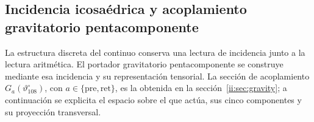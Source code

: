 \subsection{Incidencia icosaédrica y acoplamiento gravitatorio pentacomponente}
\label{ii:sec:ii-pentadica}

La estructura discreta del continuo conserva una lectura de incidencia
junto a la lectura aritmética. El portador gravitatorio pentacomponente se
construye mediante esa incidencia y su representación tensorial. La sección
de acoplamiento \(G_a(\vartheta^\circ_{108})\), con
\(a\in\{\mathrm{pre},\mathrm{ret}\}\), es la obtenida en la
sección~\ref{ii:sec:gravity}; a continuación se explicita el espacio sobre el
que actúa, sus cinco componentes y su proyección transversal.

